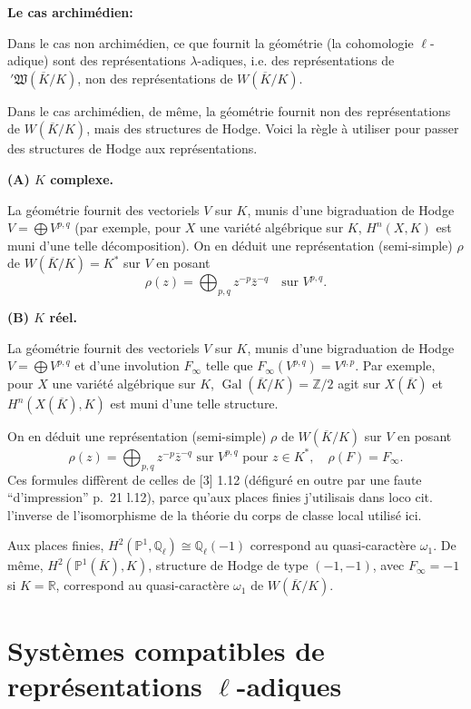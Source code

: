 \documentclass[11pt]{amsart}
\theoremstyle{plain}
\theoremstyle{definition}
\DeclareMathOperator{\Gal}{Gal}
\begin{document}
\textbf{Le cas archim\'edien:}

Dans le cas non archim\'edien, ce que fournit la g\'eom\'etrie (la cohomologie $\ell$-adique) sont des repr\'esentations $\lambda$-adiques, i.e. des repr\'esentations de $\ '\mathfrak{W}(\overline{K}/K)$, non des repr\'esentations de $W(\overline{K}/K)$.

Dans le cas archim\'edien, de m\^eme, la g\'eom\'etrie fournit non des repr\'esentations de $W(\overline{K}/K)$, mais des structures de Hodge. Voici la r\`egle \`a utiliser pour passer des structures de Hodge aux repr\'esentations.

\textbf{(A) $K$ complexe.}

La g\'eom\'etrie fournit des vectoriels $V$ sur $K$, munis d'une bigraduation de Hodge $V = \bigoplus V^{p,q}$ (par exemple, pour $X$ une vari\'et\'e alg\'ebrique sur $K$, $H^n(X,K)$ est muni d'une telle d\'ecomposition). On en d\'eduit une repr\'esentation (semi-simple) $\rho$ de $W(\overline{K}/K) = K^*$ sur $V$ en posant
\[
\rho(z) = \bigoplus_{p,q} z^{-p} \bar{z}^{-q} \quad \text{sur } V^{p,q}.
\]

\textbf{(B) $K$ r\'eel.}

La g\'eom\'etrie fournit des vectoriels $V$ sur $K$, munis d'une bigraduation de Hodge $V = \bigoplus V^{p,q}$ et d'une involution $F_\infty$ telle que $F_\infty(V^{p,q}) = V^{q,p}$. Par exemple, pour $X$ une vari\'et\'e alg\'ebrique sur $K$, $\Gal(\overline{K}/K) = \mathbb{Z}/2$ agit sur $X(\overline{K})$ et $H^n(X(\overline{K}),K)$ est muni d'une telle structure.

On en d\'eduit une repr\'esentation (semi-simple) $\rho$ de $W(\overline{K}/K)$ sur $V$ en posant
\[
\rho(z) = \bigoplus_{p,q} z^{-p} \bar{z}^{-q} \text{ sur } V^{p,q} \text{ pour } z \in K^*, \quad \rho(F) = F_\infty.
\]
Ces formules diff\`erent de celles de [3] 1.12 (d\'efigur\'e en outre par une faute ``d'impression'' p.~21 l.12), parce qu'aux places finies j'utilisais dans loco cit. l'inverse de l'isomorphisme de la th\'eorie du corps de classe local utilis\'e ici.

Aux places finies, $H^2(\mathbb{P}^1, \mathbb{Q}_\ell) \cong \mathbb{Q}_\ell(-1)$ correspond au quasi-caract\`ere $\omega_1$. De m\^eme, $H^2(\mathbb{P}^1(\overline{K}),K)$, structure de Hodge de type $(-1,-1)$, avec $F_\infty = -1$ si $K = \mathbb{R}$, correspond au quasi-caract\`ere $\omega_1$ de $W(\overline{K}/K)$.


\section{Syst\`emes compatibles de repr\'esentations $\ell$-adiques}
\end{document}

